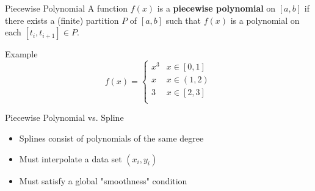 \documentclass[10pt]{beamer}
\begin{document}
\begin{frame}{Piecewise Polynomial}
A function $f(x)$ is a \textbf{piecewise polynomial} on $[a,b]$ if
there exists a (finite) partition $P$ of $[a,b]$ such that $f(x)$ is a
polynomial on each $[t_i,t_{i+1}]\in P$.

\begin{block}{Example}
\begin{equation*}
  f(x) = \begin{cases}
x^3 & x \in [0,1]\\
x & x \in (1,2)\\
3 & x \in [2,3]\\
\end{cases}
\end{equation*}
\end{block}
\begin{center}
\end{center}
\end{frame}

\begin{frame}{Piecewise Polynomial vs. Spline}


{
}
\begin{itemize}
    \item Splines consist of polynomials of the same degree
    \item Must interpolate a data set $(x_i,y_i)$
    \item Must satisfy a global "smoothness" condition
\end{itemize}

\end{frame}
\end{document}
